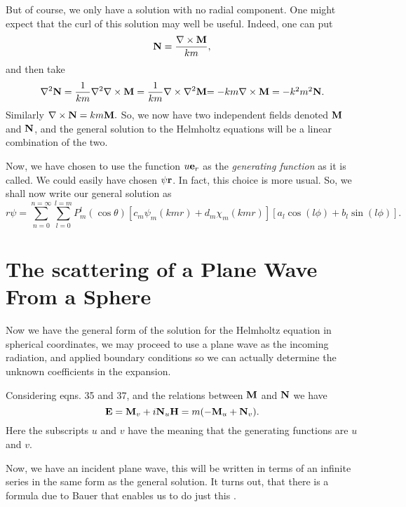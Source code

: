But of course, we only have a solution with no radial component.
One might expect that the curl of this solution may well be useful.
Indeed, one can put
\begin{equation}
{\bf N}=\frac{\nabla \times {\bf M}}{k m},
\end{equation}
and then take
\begin{equation}
\nabla^2 {\bf N}=\frac{1}{k m} \nabla^2 \nabla \times {\bf M}
= \frac{1}{k m} \nabla \times \nabla^2 {\bf M}
$$     $$
=-k m \nabla \times {\bf M}=-k^2 m^2 {\bf N}.
\end{equation}
Similarly $\nabla \times {\bf N} = k m {\bf M}.$
So, we now have two independent fields denoted ${\bf M}$ and ${\bf N}$, and
the general solution to the Helmholtz equations will be a linear combination of the two.

Now, we have chosen to use the function $u {\bf e}_r$ as the {\it generating function} as it is called. We could easily have chosen $\psi {\bf r}$. In fact, this choice is more usual. So, we shall now write our general solution as
\begin{equation}
r \psi =\sum_{n=0}^{n=\infty}
\sum_{l=0}^{l=m}
P_m^l(\cos \theta) [ c_m \psi_m(kmr)+d_m \chi_m(kmr) ] 
[a_l \cos (l \phi) +b_l \sin(l \phi)].
\end{equation}

\section{The scattering of a Plane Wave From a Sphere}

Now we have the general form of the solution for the Helmholtz equation in spherical coordinates, we may proceed to use a plane wave as the incoming radiation, and applied boundary conditions so we can actually determine the unknown coefficients in the expansion.

Considering eqns. 35 and 37, and the relations between ${\bf M}$ and ${\bf N}$
 we have
\begin{equation}
{\bf E}={\bf M}_v + i {\bf N}_u
$$       $$ 
{\bf H}= m ( -{\bf M}_u+{\bf N}_v).
\end{equation}
Here the subscripts $u$ and $v$ have the meaning that the generating functions
are $u$ and $v$.

Now,  we have an incident plane wave, this will be written in terms of an infinite series in the same form as the general solution. It turns out, that there is a formula due to Bauer that enables us to do just this \cite{Watson:Mybib}.

